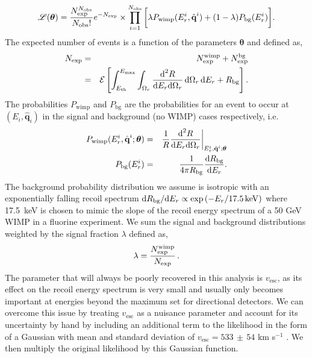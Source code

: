 \begin{equation}
	\mathscr{L}(\boldsymbol{\theta})= \frac{N_{\rm exp}^{N_{\rm obs}}}{N_{\rm obs} !} e^{-N_{\rm exp}} \times\prod_{i=1}^{N_{\rm obs}} \bigg[\lambda P_\textrm{wimp}(E_r^i,\hat{\textbf{q}}^i) + (1-\lambda)P_\textrm{bg}(E_r^i)\bigg] \nonumber. 
\end{equation}
The expected number of events is a function of the parameters $\boldsymbol{\theta}$ and defined as, 
\begin{eqnarray}
	N_{\rm exp} &=& N_{\rm exp}^{\textrm{wimp}} + N_{\rm exp}^{\textrm{bg}} \\ &=& \mathcal{E} \left[ \int_{E_\textrm{th}}^{E_\textrm{max}} \int_{\Omega_r} \frac{\textrm{d}^2R}{\textrm{d}E_r \textrm{d}\Omega_r}\, \textrm{d}\Omega_r \, \textrm{d}E_r+ R_\textrm{bg}\right].
\end{eqnarray}
The probabilities $P_\textrm{wimp}$ and $P_\textrm{bg}$ are the probabilities for an event to occur at $(E_i,\hat{\textbf{q}}_i)$ in the signal and background (no WIMP) cases respectively, i.e.
\begin{eqnarray}
	P_\textrm{wimp}(E^i_r,\hat{\textbf{q}}^i; \boldsymbol{\theta}) &=& \frac{1}{R} \frac{\textrm{d}^2 R}{\textrm{d}E_r\textrm{d}\Omega_r}\bigg|_{E_r^i,\hat{\textbf{q}}^i; \boldsymbol{\theta}} \\
	P_\textrm{bg}(E_r^i) &=& \frac{1}{4\pi R_{\rm bg}} \frac{\textrm{d}R_{\rm bg}}{\textrm{d}E_r}.
\end{eqnarray}
The background probability  distribution we assume is isotropic with an exponentially falling recoil spectrum $\textrm{d}R_{\rm bg}/\textrm{d}E_r \propto \exp\left(-E_r/17.5\,{\rm keV}\right)$ where 17.5~keV is chosen to mimic the slope of the recoil energy spectrum of a 50 GeV WIMP in a fluorine experiment. We sum the signal and background distributions weighted by the signal fraction $\lambda$ defined as,
\begin{equation}
  \lambda = \frac{N_{\rm exp}^\textrm{wimp}}{N_{\rm exp}} \, .
\end{equation}
The parameter that will always be poorly recovered in this analysis is $v_\textrm{esc}$, as its effect on the recoil energy spectrum is very small and usually only becomes important at energies beyond the maximum set for directional detectors. We can overcome this issue by treating $v_\textrm{esc}$ as a nuisance parameter and account for its uncertainty by hand by including an additional term to the likelihood in the form of a Gaussian with mean and standard deviation of $v_\textrm{esc} = 533\, \pm \, 54$ km s$^{-1}$ \cite{Piffl:2013mla}. We then multiply the original likelihood by this Gaussian function.

